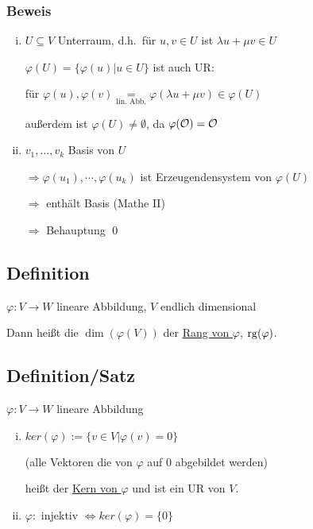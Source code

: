 \subsubsection*{Beweis}

\begin{enumerate}[(i)]
	\item
	$U \subseteq V$ Unterraum, d.h.\ für $u,v \in U$ ist $\lambda u + \mu v \in U$
	
	$\varphi(U) = \{\varphi(u) \big | u \in U\}$ ist auch UR:
	
	für $\varphi(u), \varphi(v) \underset{\text{lin. Abb.}}{=} \varphi(\lambda u + \mu v) \in \varphi(U)$
	
	außerdem ist $\varphi(U) \neq \emptyset$, da $\varphi(\mathcal{O}) = \mathcal{O}$
	
	\item
	$v_1,\dots,v_k$ Basis von $U$
	
	$\Rightarrow \varphi(u_1),\cdots,\varphi(u_k)$ ist Erzeugendensystem von $\varphi(U)$
	
	$\Rightarrow$ enthält Basis (Mathe II)
	
	$\Rightarrow$ Behauptung
	\qed 
\end{enumerate}

\subsection{Definition}

$\varphi: V \rightarrow W$ lineare Abbildung, $V$ endlich dimensional

Dann heißt die $\dim(\varphi(V))$ der \underline{Rang von $\varphi$}, $\mathrm{ rg }(\varphi)$.

\subsection{Definition/Satz}

$\varphi: V \rightarrow W$ lineare Abbildung

\begin{enumerate}[(i)]
	\item
	$ker(\varphi) := \{v \in V \big | \varphi(v) = 0\}$
	
	(alle Vektoren die von $\varphi$ auf $0$ abgebildet werden)
	
	heißt der \underline{Kern von $\varphi$} und ist ein UR von $V$.
	
	\item
	$\varphi:$ injektiv $\Leftrightarrow ker(\varphi) = \{0\}$
\end{enumerate}\bigskip

